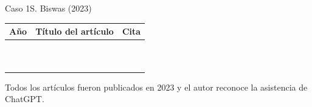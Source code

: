 \begin{frame}[allowframebreaks]{Caso 1}{S. Biswas (2023)}
    \begin{threeparttable}
        \scriptsize
        \def\arraystretch{1.75}
        \vspace{-1em}
        \begin{tabular}{c|L{8.75cm}|C{0.55cm}} \toprule
            \textbf{Año}            & \textbf{Título del artículo} & \textbf{Cita}       \\\hline
            \citeyear{biswas_2023d} &      & \cite{biswas_2023d} \\
            \citeyear{biswas_2023e} &      & \cite{biswas_2023e} \\
            \citeyear{biswas_2023j} &      & \cite{biswas_2023j} \\
            \citeyear{biswas_2023k} &      & \cite{biswas_2023k} \\
            \citeyear{biswas_2023a} &      & \cite{biswas_2023a} \\
            \citeyear{biswas_2023b} &      & \cite{biswas_2023b} \\
            \citeyear{biswas_2023i} &      & \cite{biswas_2023i} \\
            \citeyear{biswas_2023c} &      & \cite{biswas_2023c} \\
            \citeyear{biswas_2023f} &      & \cite{biswas_2023f} \\
            \citeyear{biswas_2023h} &      & \cite{biswas_2023h} \\
            \bottomrule
        \end{tabular}
        \vspace{0.25em}
        \begin{tablenotes}
            \item[] {\color{colorD}Todos los artículos fueron publicados en 2023 y el autor reconoce la asistencia de ChatGPT.}
        \end{tablenotes}
    \end{threeparttable}
\end{frame}

